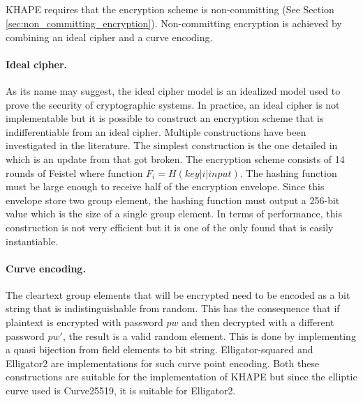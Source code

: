 ﻿\documentclass[../report.tex]{subfiles}
\begin{document}
\subsection{}
KHAPE requires that the encryption scheme is non-committing (See Section \ref{sec:non_committing_encryption}).
Non-committing encryption is achieved by combining an ideal cipher and a curve encoding.


\paragraph{Ideal cipher.}
As its name may suggest, the ideal cipher model is an idealized model used to prove the security of cryptographic systems.
In practice, an ideal cipher is not implementable %
but it is possible to construct an encryption scheme that is indifferentiable from an ideal cipher. Multiple constructions have been investigated in the literature.
The simplest construction is the one detailed in \cite{Ideal_Cipher_2} which is an update from \cite{Ideal_Cipher_1} that got broken.
The encryption scheme consists of 14 rounds of Feistel where function $F_i = H(key | i | input)$.
The hashing function must be large enough to receive half of the encryption envelope. Since this envelope store two group element, the hashing function must output a 256-bit value which is the size of a single group element.
In terms of performance, this construction is not very efficient but it is one of the only found that is easily instantiable.


\paragraph{Curve encoding.}
The cleartext group elements that will be encrypted need to be encoded as a bit string that is indistinguishable from random. This has the consequence that if plaintext is encrypted with password $pw$ and then decrypted with a different password $pw'$, the result is a valid random element.
This is done by implementing a quasi bijection from field elements to bit string.
Elligator-squared \cite{Elligator_Squared_Paper} and Elligator2 \cite{Elligator2_Paper} are implementations for such curve point encoding.
Both these constructions are suitable for the implementation of KHAPE but since the elliptic curve used is Curve25519, it is suitable for Elligator2.
\end{document}
